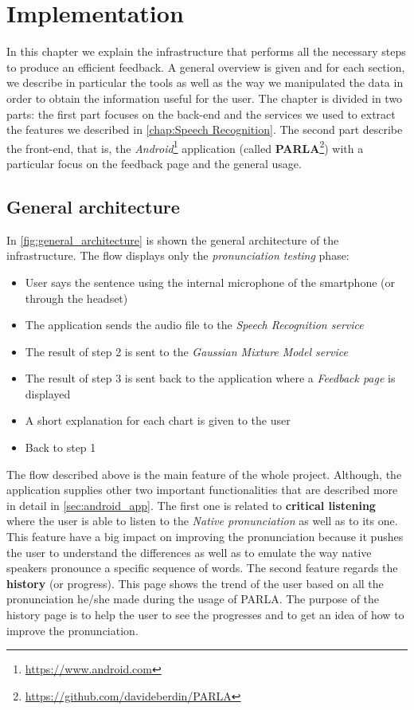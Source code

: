 \chapter{Implementation}
\label{chap:Implementation}
In this chapter we explain the infrastructure that performs all the necessary steps to produce an efficient feedback. A general overview is given and for each section, we describe in particular the tools as well as the way we manipulated the data in order to obtain the information useful for the user. The chapter is divided in two parts: the first part focuses on the back-end and the services we used to extract the features we described in \ref{chap:Speech Recognition}. The second part describe the front-end, that is, the \textit{Android}\footnote{\url{https://www.android.com}} application (called \textbf{PARLA}\footnote{\url{https://github.com/davideberdin/PARLA}}) with a particular focus on the feedback page and the general usage.

\section{General architecture}
\label{sec:general_architecture}

In \ref{fig:general_architecture} is shown the general architecture of the infrastructure.
The flow displays only the \textit{pronunciation testing} phase:

\begin{itemize}
	\item[1)] User says the sentence using the internal microphone of the smartphone (or through the headset)
	\item[2)] The application sends the audio file to the \textit{Speech Recognition service}
	\item[3)] The result of step 2 is sent to the \textit{Gaussian Mixture Model service}
	\item[4)] The result of step 3 is sent back to the application where a \textit{Feedback page} is displayed
	\item[5)] A short explanation for each chart is given to the user
	\item[6)] Back to step 1
\end{itemize}

\noindent The flow described above is the main feature of the whole project. Although, the application supplies other two important functionalities that are described more in detail in \ref{sec:android_app}. The first one is related to \textbf{critical listening} where the user is able to listen to the \textit{Native pronunciation} as well as to its one. This feature have a big impact on improving the pronunciation because it pushes the user to understand the differences as well as to emulate the way native speakers pronounce a specific sequence of words. The second feature regards the \textbf{history} (or progress). This page shows the trend of the user based on all the pronunciation he/she made during the usage of PARLA. The purpose of the history page is to help the user to see the progresses and to get an idea of how to improve the pronunciation. \\

